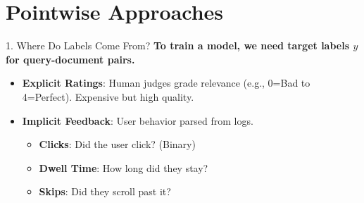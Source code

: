 \documentclass[aspectratio=169]{beamer}
\newif\ifanimated
\newcommand{\cpause}{\ifanimated\pause\fi}
\begin{document}
\section{Pointwise Approaches}

\begin{frame}[plain]
\sectionpage
\end{frame}

\begin{frame}{1. Where Do Labels Come From?}
\textbf{To train a model, we need target labels $y$ for query-document pairs.}

\vspace{0.8em}
\begin{itemize}
    \item \textbf{Explicit Ratings}: Human judges grade relevance (e.g., 0=Bad to 4=Perfect). Expensive but high quality.
    \cpause
    \item \textbf{Implicit Feedback}: User behavior parsed from logs.
    \begin{itemize}
        \item \textbf{Clicks}: Did the user click? (Binary)
        \item \textbf{Dwell Time}: How long did they stay?
        \item \textbf{Skips}: Did they scroll past it?
    \end{itemize}
\end{itemize}
\end{frame}
\end{document}
